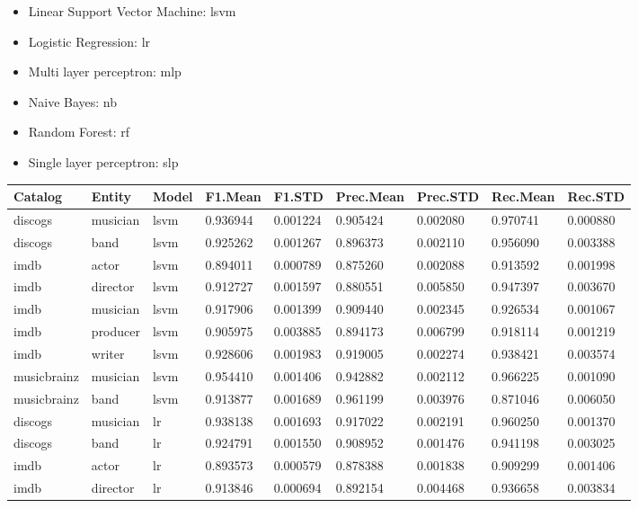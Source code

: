 \documentclass[epsfig,a4paper,11pt,titlepage,twoside,openany]{book}
\begin{document}
\begin{itemize}
    \item Linear Support Vector Machine: lsvm
    \item Logistic Regression: lr
    \item Multi layer perceptron: mlp
    \item Naive Bayes: nb
    \item Random Forest: rf
    \item Single layer perceptron: slp
\end{itemize}


\begin{longtable}{|l|l|l|l|l|l|l|l|l|}
\hline
Catalog     & Entity   & Model & F1.Mean  & F1.STD   & Prec.Mean & Prec.STD & Rec.Mean & Rec.STD  \\ \hline
discogs     & musician & lsvm  & 0.936944 & 0.001224 & 0.905424  & 0.002080 & 0.970741 & 0.000880 \\
discogs     & band     & lsvm  & 0.925262 & 0.001267 & 0.896373  & 0.002110 & 0.956090 & 0.003388 \\
imdb        & actor    & lsvm  & 0.894011 & 0.000789 & 0.875260  & 0.002088 & 0.913592 & 0.001998 \\
imdb        & director & lsvm  & 0.912727 & 0.001597 & 0.880551  & 0.005850 & 0.947397 & 0.003670 \\
imdb        & musician & lsvm  & 0.917906 & 0.001399 & 0.909440  & 0.002345 & 0.926534 & 0.001067 \\
imdb        & producer & lsvm  & 0.905975 & 0.003885 & 0.894173  & 0.006799 & 0.918114 & 0.001219 \\
imdb        & writer   & lsvm  & 0.928606 & 0.001983 & 0.919005  & 0.002274 & 0.938421 & 0.003574 \\
musicbrainz & musician & lsvm  & 0.954410 & 0.001406 & 0.942882  & 0.002112 & 0.966225 & 0.001090 \\ 
musicbrainz & band     & lsvm  & 0.913877 & 0.001689 & 0.961199  & 0.003976 & 0.871046 & 0.006050 \\ \hline
discogs     & musician & lr    & 0.938138 & 0.001693 & 0.917022  & 0.002191 & 0.960250 & 0.001370 \\
discogs     & band     & lr    & 0.924791 & 0.001550 & 0.908952  & 0.001476 & 0.941198 & 0.003025 \\
imdb        & actor    & lr    & 0.893573 & 0.000579 & 0.878388  & 0.001838 & 0.909299 & 0.001406 \\
imdb        & director & lr    & 0.913846 & 0.000694 & 0.892154  & 0.004468 & 0.936658 & 0.003834 \\

\end{longtable}
\end{document}
